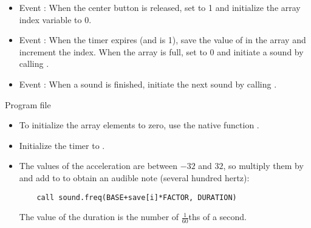 
\begin{itemize}
\item Event : When the center button is released,
set  to 1 and initialize the array index variable  to 0.
\item Event : When the timer expires (and  is 1),
save the value of  in the array  and increment
the index. When the array is full, set  to 0 and initiate
a sound by calling .
\item Event : When a sound is finished,
initiate the next sound by calling .
\end{itemize}


{\raggedleft \hfill Program file }

\begin{itemize}
\item To initialize the array elements to zero, use the native function .
\item Initialize the timer to .
\item The values of the acceleration are between $-32$ and $32$,
so multiply them by  and add to  to obtain
an audible note (several hundred hertz):
\begin{verbatim}
    call sound.freq(BASE+save[i]*FACTOR, DURATION)
\end{verbatim}
The value of the duration is the number of $\frac{1}{60}$ths of a second.
\end{itemize}


